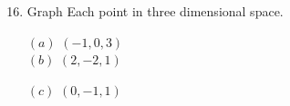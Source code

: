 \documentclass{report}
\theoremstyle{definition}
\begin{document}
\begin{enumerate}
    \setcounter{enumi}{15}
    \item Graph Each point in three dimensional space.\\
    
    \begin{minipage}{0.25\linewidth}
    \vspace{-3cm}
        $(a)$ $(-1,0,3)$\\
        
        $(b)$ $(2,-2,1)$\\
    \end{minipage}
    \begin{minipage}{0.25\linewidth}
    \vspace{-3cm}
        $(c)$ $(0,-1,1)$\\
        

\end{minipage}
\end{enumerate}
\end{document}
